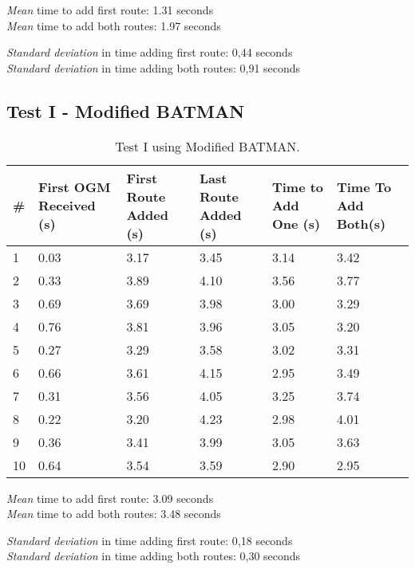 \emph{Mean} time to add first route: 1.31 seconds\\
\emph{Mean} time to add both routes: 1.97 seconds

\emph{Standard deviation} in time adding first route: 0,44 seconds\\
\emph{Standard deviation} in time adding both routes: 0,91 seconds

\subsection{Test I - Modified BATMAN}
\begin{table}[h]
	\centering
	\begin{tabular}{| l || p{24mm} || p{22mm} | p{22mm} || p{20mm} |  p{20mm} |}\hline
 		\textbf{\#} & \textbf{First OGM Received (s)} & \textbf{First Route Added (s)} & \textbf{Last Route Added (s)} & \textbf{Time to Add One (s)} & \textbf{Time To Add Both(s)}\\\hline
 		 1 & 0.03 & 3.17 & 3.45 & 3.14 & 3.42\\\hline
 		 2 & 0.33 & 3.89 & 4.10 & 3.56 & 3.77\\\hline
 		 3 & 0.69 & 3.69 & 3.98 & 3.00 & 3.29\\\hline
 		 4 & 0.76 & 3.81 & 3.96 & 3.05 & 3.20\\\hline
 		 5 & 0.27 & 3.29 & 3.58 & 3.02 & 3.31\\\hline
 		 6 & 0.66 & 3.61 & 4.15 & 2.95 & 3.49\\\hline
 		 7 & 0.31 & 3.56 & 4.05 & 3.25 & 3.74\\\hline
 		 8 & 0.22 & 3.20 & 4.23 & 2.98 & 4.01\\\hline
 		 9 & 0.36 & 3.41 & 3.99 & 3.05 & 3.63\\\hline
 		10 & 0.64 & 3.54 & 3.59 & 2.90 & 2.95\\\hline  
	\end{tabular}
	\caption{Test I using Modified BATMAN.}
	\label{tab:test1_secure}
\end{table}

\emph{Mean} time to add first route: 3.09 seconds\\
\emph{Mean} time to add both routes: 3.48 seconds

\emph{Standard deviation} in time adding first route: 0,18 seconds\\
\emph{Standard deviation} in time adding both routes: 0,30 seconds

